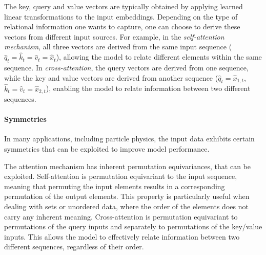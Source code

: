 The key, query and value vectors are typically obtained by applying learned linear transformations to the input embeddings. Depending on the type of relational information one wants to capture, one can choose to derive these vectors from different input sources. For example, in the \textit{self-attention mechanism}, all three vectors are derived from the same input sequence ($\hat q_t = \hat k_t=\hat v_t = \hat x_t$), allowing the model to relate different elements within the same sequence. In \textit{cross-attention}, the query vectors are derived from one sequence, while the key and value vectors are derived from another sequence ($\hat q_t = \hat x_{1,t}$, $\hat k_t=\hat v_t = \hat x_{2,t}$), enabling the model to relate information between two different sequences.
\paragraph{Symmetries}
In many applications, including particle physics, the input data exhibits certain symmetries that can be exploited to improve model performance.

The attention mechanism has inherent permutation equivariances, that can be exploited. Self-attention is permutation equivariant to the input sequence, meaning that permuting the input elements results in a corresponding permutation of the output elements. This property is particularly useful when dealing with sets or unordered data, where the order of the elements does not carry any inherent meaning. Cross-attention is permutation equivariant to permutations of the query inputs and separately to permutations of the key/value inputs. This allows the model to effectively relate information between two different sequences, regardless of their order.

